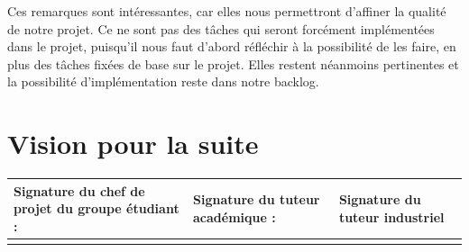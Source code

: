\documentclass[12pt,titlepage,french]{article}
\begin{document}
Ces remarques sont intéressantes, car elles nous permettront d'affiner la qualité de notre projet. Ce ne sont pas des tâches qui seront forcément implémentées dans le projet, puisqu'il nous faut d'abord réfléchir à la possibilité de les faire, en plus des tâches fixées de base sur le projet. Elles restent néanmoins pertinentes et la possibilité d'implémentation reste dans notre backlog.

\section{Vision pour la suite}


\noindent\begin{tabularx}{\textwidth}{|X|X|X|}
    \hline
    \textbf{Signature du chef de projet du groupe étudiant :} & \textbf{Signature du tuteur académique :} & \textbf{Signature du tuteur industriel}\\
    \hline
   \rule{0pt}{3cm} &
    &\\
    \hline
\end{tabularx}
\end{document}
